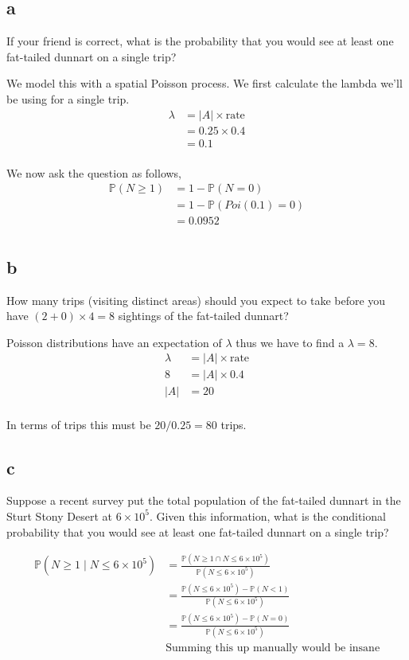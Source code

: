 \documentclass{article}
\newcommand{\prob}{\mathbb{P}}
\begin{document}
\subsection{a}
If your friend is correct, what is the probability that you would see at least
one fat-tailed dunnart on a single trip?

We model this with a spatial Poisson process. We first calculate the lambda
we'll be using for a single trip.
\begin{align*}
    \lambda &= |A| \times \text{rate} \\
    &= 0.25 \times 0.4 \\
    &= 0.1 \\
\end{align*}

We now ask the question as follows,
\begin{align*}
    \prob(N \geq 1) &= 1 - \prob(N = 0) \\
    &= 1 - \prob(Poi(0.1) = 0) \\
    &= 0.0952 \\
\end{align*}

\subsection{b}
How many trips (visiting distinct areas) should you expect to take before you
have $(2 + 0) \times 4 = 8$ sightings of the fat-tailed dunnart?

Poisson distributions have an expectation of $\lambda$ thus we have to find a
$\lambda = 8$.
\begin{align*}
    \lambda &= |A| \times \text{rate} \\
    8 &= |A| \times 0.4 \\
    |A| &= 20 \\
\end{align*}

In terms of trips this must be $20/0.25 = 80$ trips.

\subsection{c}
Suppose a recent survey put the total population of the fat-tailed dunnart in
the Sturt Stony Desert at $6 \times 10^5$. Given this information, what is the
conditional probability that you would see at least one fat-tailed dunnart on a
single trip?

\begin{align*}
    \prob(N \geq 1 \;|\; N \leq 6 \times 10^5)
    &= \frac{\prob(N \geq 1 \cap N \leq 6 \times 10^5)}
    {\prob(N \leq 6 \times 10^5)} \\
    &= \frac{\prob(N \leq 6 \times 10^5) - \prob(N < 1)}
    {\prob(N \leq 6 \times 10^5)} \\
    &= \frac{\prob(N \leq 6 \times 10^5) - \prob(N = 0)}
    {\prob(N \leq 6 \times 10^5)} \\
    &\text{Summing this up manually would be insane} \\
\end{align*}
\end{document}
